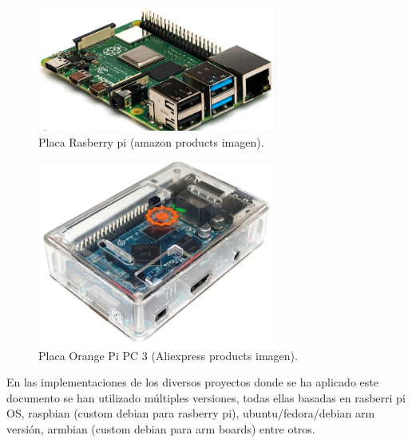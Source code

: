 \begin{figure}[!htb]
\begin{center}
\includegraphics[width=0.7\textwidth]{./figuras/rasberripi}
\caption{Placa Rasberry pi (amazon products imagen).}
\label{F:rasberripi}
\end{center}
\end{figure}
\begin{figure}[!htbp]
\begin{center}
\includegraphics[width=0.7\textwidth]{./figuras/orangepi_pc}
\caption{Placa Orange Pi PC 3 (Aliexpress products imagen).}
\label{F:orangepi_pc}
\end{center}
\end{figure}
En las implementaciones de los diversos proyectos donde se ha aplicado este documento se han utilizado múltiples versiones, todas ellas basadas en rasberri pi OS, raspbian (custom debian para rasberry pi), ubuntu/fedora/debian arm versión, armbian (custom debian para arm boards) entre otros.


